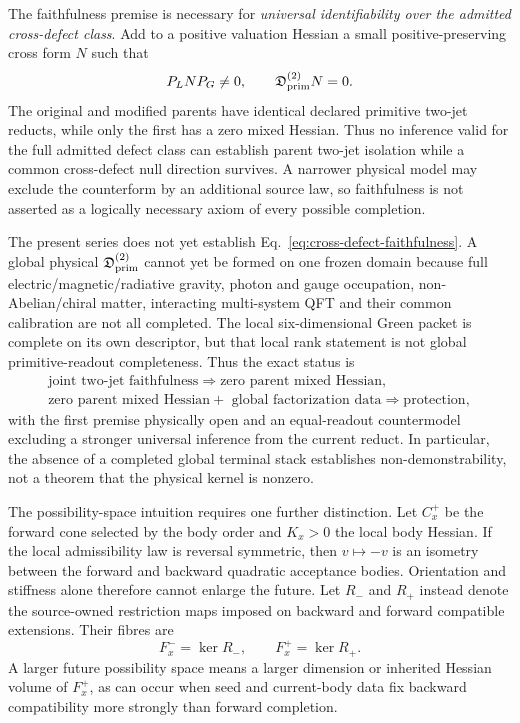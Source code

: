 \documentclass[11pt]{article}
\begin{document}
The faithfulness premise is necessary for \emph{universal identifiability over
the admitted cross-defect class}.  Add to a positive valuation Hessian a small
positive-preserving cross form $N$ such that
\begin{equation}
 P_LNP_G\neq0,\qquad \mathfrak D_{\rm prim}^{(2)}N=0.
 \label{eq:equal-readout-hidden-parent}
\end{equation}
The original and modified parents have identical declared primitive two-jet
reducts, while only the first has a zero mixed Hessian.  Thus no inference
valid for the full admitted defect class can establish parent two-jet
isolation while a common cross-defect null direction survives.  A narrower
physical model may exclude the counterform by an additional source law, so
faithfulness is not asserted as a logically necessary axiom of every possible
completion.

The present series does not yet establish
Eq.~\eqref{eq:cross-defect-faithfulness}. A global physical
$\mathfrak D_{\rm prim}^{(2)}$ cannot yet be formed on one frozen domain because full
electric/magnetic/radiative gravity, photon and gauge occupation,
non-Abelian/chiral matter, interacting multi-system QFT and their common
calibration are not all completed. The local six-dimensional Green packet is
complete on its own descriptor, but that local rank statement is not global
primitive-readout completeness. Thus the exact status is
\begin{equation}
 \begin{gathered}
 \text{joint two-jet faithfulness}
 \Longrightarrow
 \text{zero parent mixed Hessian},\\
 \text{zero parent mixed Hessian}
 +\text{ global factorization data}
 \Longrightarrow \text{protection},
 \end{gathered}
 \label{eq:valuation-proof-chain}
\end{equation}
with the first premise physically open and an equal-readout countermodel
excluding a stronger universal inference from the current reduct.  In
particular, the absence of a completed global terminal stack establishes
non-demonstrability, not a theorem that the physical kernel is nonzero.

The possibility-space intuition requires one further distinction. Let
$C_x^+$ be the forward cone selected by the body order and $K_x>0$ the local
body Hessian. If the local admissibility law is reversal symmetric, then
$v\mapsto-v$ is an isometry between the forward and backward quadratic
acceptance bodies. Orientation and stiffness alone therefore cannot enlarge
the future. Let $R_-$ and $R_+$ instead denote the source-owned restriction
maps imposed on backward and forward compatible extensions. Their fibres are
\begin{equation}
 F_x^- = \ker R_-,\qquad F_x^+=\ker R_+.
 \label{eq:future-extension-fibres}
\end{equation}
A larger future possibility space means a larger dimension or inherited
Hessian volume of $F_x^+$, as can occur when seed and current-body data fix
backward compatibility more strongly than forward completion.
\end{document}
